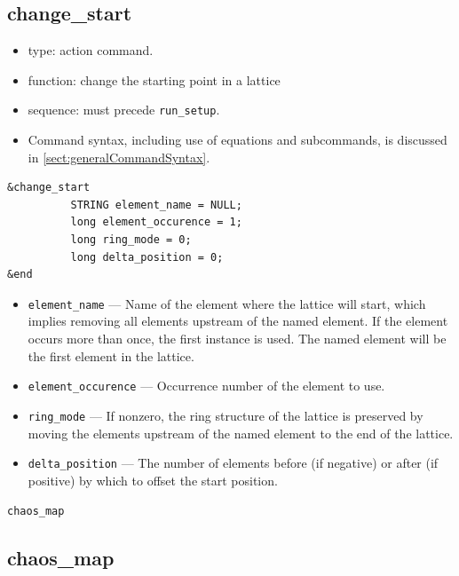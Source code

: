 \documentclass[11pt]{article}
\begin{document}
\subsection{change\_start\label{subsec:changestart}}

\begin{itemize}
\item type: action command.
\item function: change the starting point in a lattice
\item sequence: must precede \verb|run_setup|.
\item Command syntax, including use of equations and subcommands, is discussed in \ref{sect:generalCommandSyntax}.
\end{itemize}

\begin{verbatim}
&change_start
          STRING element_name = NULL;
          long element_occurence = 1;
          long ring_mode = 0;
          long delta_position = 0;
&end
\end{verbatim}

\begin{itemize}
\item \verb|element_name| --- Name of the element where the lattice will start, which implies removing all 
  elements upstream of the named element. If the element occurs more than once, the first instance is used.
  The named element will be the first element in the lattice.
\item \verb|element_occurence| --- Occurrence number of the element to use.
\item \verb|ring_mode| --- If nonzero, the ring structure of the lattice is preserved by moving the elements 
  upstream of the named element to the end of the lattice.
\item \verb|delta_position| --- The number of elements before (if negative) or after (if positive) by which to
  offset the start position.
\end{itemize}

\newpage
\begin{center}{\Large\verb|chaos_map|}\end{center}
\subsection{chaos\_map \label{subsec:chaosmap}}
\end{document}
